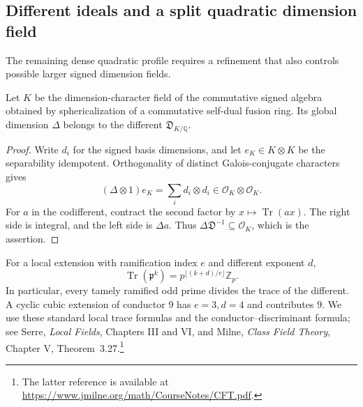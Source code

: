 \subsection{Different ideals and a split quadratic dimension field}
\label{sec:round3-different}
The remaining dense quadratic profile requires a refinement that also controls
possible larger signed dimension fields.

\begin{theorem}\label{thm:signed-different}
Let $K$ be the dimension-character field of the commutative signed algebra
obtained by sphericalization of a commutative self-dual fusion ring.
Its global dimension $\Delta$ belongs to the different
$\mathfrak D_{K/\mathbb Q}$.
\end{theorem}
\begin{proof}
Write $d_i$ for the signed basis dimensions, and let $e_K\in K\otimes K$
be the separability idempotent. Orthogonality of distinct Galois-conjugate
characters gives
\[
 (\Delta\otimes1)e_K=\sum_i d_i\otimes d_i
                 \in\mathcal O_K\otimes\mathcal O_K.
\]
For $a$ in the codifferent, contract the second factor by
$x\mapsto\operatorname{Tr}(ax)$. The right side is integral, and the left
side is $\Delta a$. Thus $\Delta\mathfrak D^{-1}\subseteq\mathcal O_K$,
which is the assertion.
\end{proof}

For a local extension with ramification index $e$ and different exponent $d$,
\[
 \operatorname{Tr}(\mathfrak p^k)
       =p^{\lfloor(k+d)/e\rfloor}\mathbb Z_p.
\]
In particular, every tamely ramified odd prime divides the trace of the
different. A cyclic cubic extension of conductor $9$ has $e=3,d=4$ and
contributes $9$. We use these standard local trace formulas and the
conductor--discriminant formula; see Serre, \emph{Local Fields},
Chapters III and VI, and Milne, \emph{Class Field Theory}, Chapter V, Theorem~3.27.\footnote{The latter reference is available at
\url{https://www.jmilne.org/math/CourseNotes/CFT.pdf}.}

